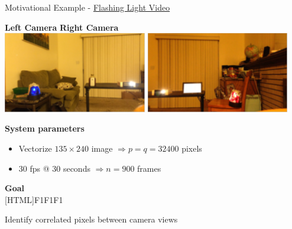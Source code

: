 \documentclass[8pt]{beamer}
\begin{document}
\begin{frame}{Motivational Example -
    \href{run:/home/user/Documents/thesis_vids/flashing_setup.mp4}{Flashing Light Video}}

  \begin{center}\textbf{Left Camera} \hspace{20ex} \textbf{Right Camera}\\
    \includegraphics[width=0.47\textwidth]{figures/flashing_left.png}\hspace{2ex}
    \includegraphics[width=0.47\textwidth]{figures/flashing_right.png}
  \end{center}

  \vspace{2ex}

  \textbf{System parameters}
  \begin{itemize}
  \item Vectorize $135\times 240$ image $\Rightarrow p=q=32400$ pixels
  \item 30 fps @ 30 seconds $\Rightarrow n=900$ frames
  \end{itemize}

  \begin{center}
  \textbf{Goal}\\
  [HTML]{F1F1F1}{\parbox{0.4\textwidth}{%
      \centering
      Identify correlated pixels between camera views
}}
\end{center}
  

\end{frame}
\end{document}
